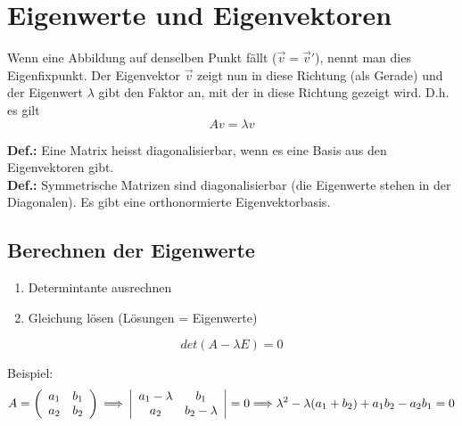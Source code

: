 \section{Eigenwerte und Eigenvektoren}
	Wenn eine Abbildung auf denselben Punkt fällt ($\vec{v} = \vec{v}'$), nennt man dies Eigenfixpunkt.
	Der Eigenvektor $\vec{v}$ zeigt nun in diese Richtung (als Gerade) und der Eigenwert $\lambda$ gibt den Faktor an, mit der in
	diese Richtung gezeigt wird. D.h. es gilt
	\begin{equation*}
		Av = \lambda v
	\end{equation*}

	\textbf{Def.:} Eine Matrix heisst diagonalisierbar, wenn es eine Basis aus den Eigenvektoren gibt.\\

	\textbf{Def.:} Symmetrische Matrizen sind diagonalisierbar (die Eigenwerte stehen in der Diagonalen). 
	Es gibt eine orthonormierte Eigenvektorbasis.

	\subsection{Berechnen der Eigenwerte}
		\begin{enumerate}
			\item Determintante ausrechnen
			\item Gleichung lösen (Lösungen = Eigenwerte)
		\end{enumerate}
		\begin{equation*}
			det(A - \lambda E) = 0
		\end{equation*}
		
		Beispiel:
		\begin{equation*}
			A = \left(\begin{array}{cc}
				a_1 & b_1\\
				a_2 & b_2
			\end{array}\right) \\ \Longrightarrow\\
			\left|\begin{array}{cc}
				a_1 - \lambda & b_1\\
				a_2 & b_2 - \lambda
			\end{array}\right| = 0 \\ \Longrightarrow\\
			\lambda^2 -\lambda(a_1 + b_2) + a_1b_2 - a_2b_1 = 0
		\end{equation*}
		
